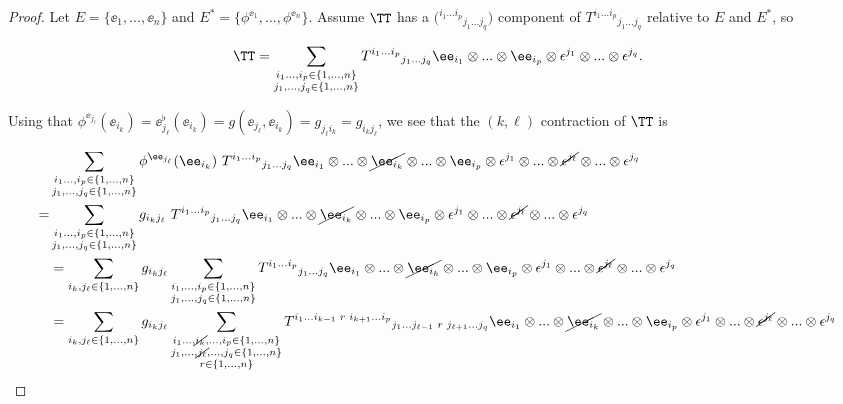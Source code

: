\begin{proof}
     Let $E = \{\ee_1, ..., \ee_n\}$ and $E^* = \{\phi^{\ee_1}, ..., \phi^{\ee_n}\}$. Assume $\TT$ has a $\Big( {}^{i_1 ... i_p}{}_{j_1 ... j_q} \Big)$ component of $T^{i_1 ... i_p}{}_{j_1 ... j_q}$ relative to $E$ and $E^*$, so
     
    \begin{align*}
        \TT = \sum_{\substack{i_1 ..., i_p \in \{1, ..., n\} \\ j_1, ..., j_q \in \{1, ..., n\}}} T^{i_1 ... i_p}{}_{j_1 ... j_q} \ee_{i_1} \otimes ... \otimes \ee_{i_p} \otimes \epsilon^{j_1} \otimes ... \otimes \epsilon^{j_q}.
    \end{align*}
     
    Using that $\phi^{\ee_{j_\ell}}(\ee_{i_k}) = \ee_{j_\ell}^\flat(\ee_{i_k}) = g(\ee_{j_\ell}, \ee_{i_k}) = g_{j_\ell i_k} = g_{i_k j_\ell}$, we see that the $(k, \ell)$ contraction of $\TT$ is
    
    \begin{align*}
        &\sum_{\substack{i_1 ..., i_p \in \{1, ..., n\} \\ j_1, ..., j_q \in \{1, ..., n\}}} \phi^{\ee_{j_\ell}}(\ee_{i_k}) \spc T^{i_1 ... i_p}{}_{j_1 ... j_q} \ee_{i_1} \otimes ... \otimes \cancel{\ee_{i_k}} \otimes ... \otimes \ee_{i_p} \otimes \epsilon^{j_1} \otimes ... \otimes \cancel{\epsilon^{j_\ell}} \otimes... \otimes \epsilon^{j_q} 
        \\
        = &\sum_{\substack{i_1 ..., i_p \in \{1, ..., n\} \\ j_1, ..., j_q \in \{1, ..., n\}}} g_{i_k j_\ell} \spc T^{i_1 ... i_p}{}_{j_1 ... j_q} \ee_{i_1} \otimes ... \otimes \cancel{\ee_{i_k}} \otimes ... \otimes \ee_{i_p} \otimes \epsilon^{j_1} \otimes ... \otimes \cancel{\epsilon^{j_\ell}} \otimes... \otimes \epsilon^{j_q} 
        \\
        &= \sum_{i_k, j_\ell \in \{1, ..., n\}} g_{i_k j_\ell} \sum_{\substack{i_1, ..., i_p \in \{1, ..., n\} \\ j_1, ..., j_q \in \{1, ..., n\}}} T^{i_1 ... i_p}{}_{j_1 ... j_q} \ee_{i_1} \otimes ... \otimes \cancel{\ee_{i_k}} \otimes ... \otimes \ee_{i_p} \otimes \epsilon^{j_1} \otimes ... \otimes \cancel{\epsilon^{j_\ell}} \otimes... \otimes \epsilon^{j_q} 
        \\
        &= \sum_{i_k, j_\ell \in \{1, ..., n\}} g_{i_k j_\ell} \sum_{\substack{i_1 ..., \cancel{i_k}, ..., i_p \in \{1, ..., n\} \\ j_1, ..., \cancel{j_\ell}, ..., j_q \in \{1, ..., n\} \\ r \in \{1, ..., n\}}} T^{i_1 ... i_{k - 1} \spc r \spc i_{k + 1} ... i_p}{}_{j_1 ... j_{\ell - 1} \spc r \spc j_{\ell + 1} ... j_q} \ee_{i_1} \otimes ... \otimes \cancel{\ee_{i_k}} \otimes ... \otimes \ee_{i_p} \otimes \epsilon^{j_1} \otimes ... \otimes \cancel{\epsilon^{j_\ell}} \otimes... \otimes \epsilon^{j_q} 
    \end{align*}
        

\end{proof}
